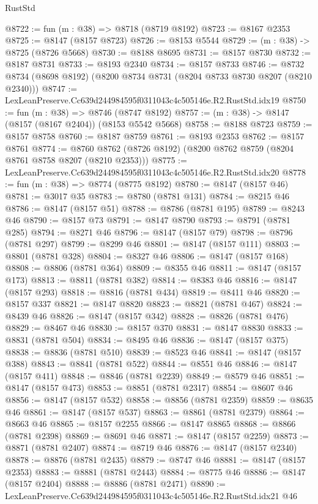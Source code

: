 \begin{lexlean}{RustStd}
\begin{coremodule}
@8722 := fun (m : @38) => @8718 (@8719 @8192)
@8723 := @8167 @2353
@8725 := @8147 (@8157 @8723)
@8726 := @8153 @5544
@8729 := (m : @38) -> @8725 (@8726 @5668)
@8730 := @8188 @8695
@8731 := @8157 @8730
@8732 := @8187 @8731
@8733 := @8193 @2340
@8734 := @8157 @8733
@8746 := @8732 @8734 (@8698 @8192) (@8200 @8734 @8731 (@8204 @8733 @8730 @8207 (@8210 @2340)))
@8747 := LexLeanPreserve.Cc639d244984595f0311043c4c505146e.R2.RustStd.idx19
@8750 := fun (m : @38) => @8746 (@8747 @8192)
@8757 := (m : @38) -> @8147 (@8157 (@8167 @2404)) (@8153 @5542 @5668)
@8758 := @8188 @8723
@8759 := @8157 @8758
@8760 := @8187 @8759
@8761 := @8193 @2353
@8762 := @8157 @8761
@8774 := @8760 @8762 (@8726 @8192) (@8200 @8762 @8759 (@8204 @8761 @8758 @8207 (@8210 @2353)))
@8775 := LexLeanPreserve.Cc639d244984595f0311043c4c505146e.R2.RustStd.idx20
@8778 := fun (m : @38) => @8774 (@8775 @8192)
@8780 := @8147 (@8157 @46)
@8781 := @3017 @35
@8783 := @8780 (@8781 @131)
@8784 := @8215 @46
@8786 := @8147 (@8157 @51)
@8788 := @8786 (@8781 @195)
@8789 := @8243 @46
@8790 := @8157 @73
@8791 := @8147 @8790
@8793 := @8791 (@8781 @285)
@8794 := @8271 @46
@8796 := @8147 (@8157 @79)
@8798 := @8796 (@8781 @297)
@8799 := @8299 @46
@8801 := @8147 (@8157 @111)
@8803 := @8801 (@8781 @328)
@8804 := @8327 @46
@8806 := @8147 (@8157 @168)
@8808 := @8806 (@8781 @364)
@8809 := @8355 @46
@8811 := @8147 (@8157 @173)
@8813 := @8811 (@8781 @382)
@8814 := @8383 @46
@8816 := @8147 (@8157 @293)
@8818 := @8816 (@8781 @434)
@8819 := @8411 @46
@8820 := @8157 @337
@8821 := @8147 @8820
@8823 := @8821 (@8781 @467)
@8824 := @8439 @46
@8826 := @8147 (@8157 @342)
@8828 := @8826 (@8781 @476)
@8829 := @8467 @46
@8830 := @8157 @370
@8831 := @8147 @8830
@8833 := @8831 (@8781 @504)
@8834 := @8495 @46
@8836 := @8147 (@8157 @375)
@8838 := @8836 (@8781 @510)
@8839 := @8523 @46
@8841 := @8147 (@8157 @388)
@8843 := @8841 (@8781 @522)
@8844 := @8551 @46
@8846 := @8147 (@8157 @411)
@8848 := @8846 (@8781 @2239)
@8849 := @8579 @46
@8851 := @8147 (@8157 @473)
@8853 := @8851 (@8781 @2317)
@8854 := @8607 @46
@8856 := @8147 (@8157 @532)
@8858 := @8856 (@8781 @2359)
@8859 := @8635 @46
@8861 := @8147 (@8157 @537)
@8863 := @8861 (@8781 @2379)
@8864 := @8663 @46
@8865 := @8157 @2255
@8866 := @8147 @8865
@8868 := @8866 (@8781 @2398)
@8869 := @8691 @46
@8871 := @8147 (@8157 @2259)
@8873 := @8871 (@8781 @2407)
@8874 := @8719 @46
@8876 := @8147 (@8157 @2340)
@8878 := @8876 (@8781 @2435)
@8879 := @8747 @46
@8881 := @8147 (@8157 @2353)
@8883 := @8881 (@8781 @2443)
@8884 := @8775 @46
@8886 := @8147 (@8157 @2404)
@8888 := @8886 (@8781 @2471)
@8890 := LexLeanPreserve.Cc639d244984595f0311043c4c505146e.R2.RustStd.idx21 @46

\end{coremodule}
\end{lexlean}
